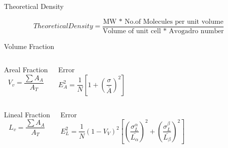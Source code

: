\documentclass[10pt]{beamer}
\begin{document}
{%
\begin{frame}[fragile]{Theoretical Density}

\begin{equation*}
Theoretical Density = \dfrac{\text{MW * No.of Molecules per unit volume}}{\text{Volume of unit cell * Avogadro number}}
\end{equation*}   
    
\end{frame}
}
{%
\begin{frame}[fragile]{Volume Fraction}


  \begin{columns}[T,onlytextwidth]
 
\begin{block}{Areal Fraction}
\begin{equation*}
V_{v} = \dfrac{\sum A_{A}}{A_{T}}
\end{equation*} 
\end{block}
 

\begin{block}{Error}
\begin{equation*}
E_{A}^{2} = \dfrac{1}{N}\left[ 1+ \left( \dfrac{\sigma}{\bar{A}} \right)^{2} \right]
\end{equation*} 
\end{block}

\end{columns}

  \begin{columns}[T,onlytextwidth]
\begin{block}{Lineal Fraction}
\begin{equation*}
L_{v} = \dfrac{\sum A_{A}}{A_{T}}
\end{equation*} 
\end{block}
 

\begin{block}{Error}
\small
\begin{equation*}
E_{L}^{2} = \dfrac{1}{N}(1-V_{V})^{2}\left[ \left( \dfrac{\sigma^{\alpha}_{L}}{\bar{L_{\alpha}}} \right)^{2} + \left( \dfrac{\sigma^{\beta}_{L}}{\bar{L_{\beta}}} \right)^{2} \right]
\end{equation*}


\end{block}
\end{columns}
\end{frame}}
\end{document}
